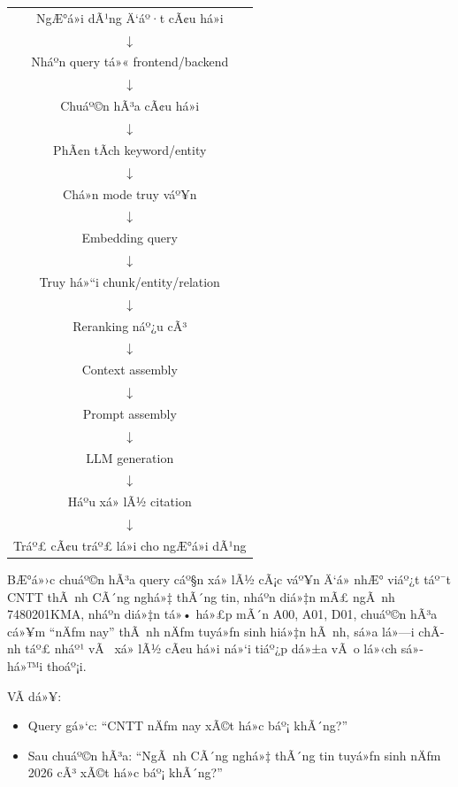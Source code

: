 ﻿\documentclass[12pt,a4paper]{report}
\begin{document}
\begin{center}
\begin{tabular}{c}
NgÆ°á»i dÃ¹ng Ä‘áº·t cÃ¢u há»i \\
$\downarrow$ \\
Nháº­n query tá»« frontend/backend \\
$\downarrow$ \\
Chuáº©n hÃ³a cÃ¢u há»i \\
$\downarrow$ \\
PhÃ¢n tÃ­ch keyword/entity \\
$\downarrow$ \\
Chá»n mode truy váº¥n \\
$\downarrow$ \\
Embedding query \\
$\downarrow$ \\
Truy há»“i chunk/entity/relation \\
$\downarrow$ \\
Reranking náº¿u cÃ³ \\
$\downarrow$ \\
Context assembly \\
$\downarrow$ \\
Prompt assembly \\
$\downarrow$ \\
LLM generation \\
$\downarrow$ \\
Háº­u xá»­ lÃ½ citation \\
$\downarrow$ \\
Tráº£ cÃ¢u tráº£ lá»i cho ngÆ°á»i dÃ¹ng
\end{tabular}
\end{center}

BÆ°á»›c chuáº©n hÃ³a query cáº§n xá»­ lÃ½ cÃ¡c váº¥n Ä‘á» nhÆ° viáº¿t táº¯t CNTT thÃ nh CÃ´ng nghá»‡ thÃ´ng tin, nháº­n diá»‡n mÃ£ ngÃ nh 7480201KMA, nháº­n diá»‡n tá»• há»£p mÃ´n A00, A01, D01, chuáº©n hÃ³a cá»¥m ``nÄƒm nay'' thÃ nh nÄƒm tuyá»ƒn sinh hiá»‡n hÃ nh, sá»­a lá»—i chÃ­nh táº£ nháº¹ vÃ  xá»­ lÃ½ cÃ¢u há»i ná»‘i tiáº¿p dá»±a vÃ o lá»‹ch sá»­ há»™i thoáº¡i.

VÃ­ dá»¥:

\begin{itemize}
    \item Query gá»‘c: ``CNTT nÄƒm nay xÃ©t há»c báº¡ khÃ´ng?''
    \item Sau chuáº©n hÃ³a: ``NgÃ nh CÃ´ng nghá»‡ thÃ´ng tin tuyá»ƒn sinh nÄƒm 2026 cÃ³ xÃ©t há»c báº¡ khÃ´ng?''
\end{itemize}
\end{document}

